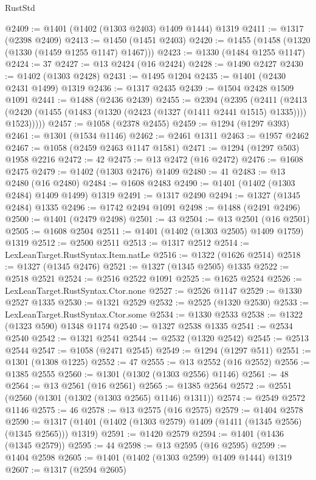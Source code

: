 \begin{lexlean}{RustStd}
\begin{coremodule}
{\begin{coremodule}
{{{{{{{{{{{{{{{{{{{{{{{{{{{{{{{{{{{{{{@2409 := @1401 (@1402 (@1303 @2403) @1409 @1444) @1319
@2411 := @1317 (@2398 @2409)
@2413 := @1450 (@1451 @2403)
@2420 := @1455 (@1458 (@1320 (@1330 (@1459 @1255 @1147) @1467)))
@2423 := @1330 (@1484 @1255 @1147)
@2424 := 37
@2427 := @13 @2424 (@16 @2424)
@2428 := @1490 @2427
@2430 := @1402 (@1303 @2428)
@2431 := @1495 @1204
@2435 := @1401 (@2430 @2431 @1499) @1319
@2436 := @1317 @2435
@2439 := @1504 @2428 @1509 @1091
@2441 := @1488 (@2436 @2439)
@2455 := @2394
    (@2395
      (@2411
        (@2413 (@2420 (@1455 (@1483 (@1320 (@2423 (@1327 (@1411 @2441 @1515) @1335)))) @1523)))))
@2457 := @1058 (@2378 @2455)
@2459 := @1294 (@1297 @393)
@2461 := @1301 (@1534 @1146)
@2462 := @2461 @1311
@2463 := @1957 @2462
@2467 := @1058 (@2459 @2463 @1147 @1581)
@2471 := @1294 (@1297 @503) @1958 @2216
@2472 := 42
@2475 := @13 @2472 (@16 @2472)
@2476 := @1608 @2475
@2479 := @1402 (@1303 @2476) @1409
@2480 := 41
@2483 := @13 @2480 (@16 @2480)
@2484 := @1608 @2483
@2490 := @1401 (@1402 (@1303 @2484) @1409 @1499) @1319
@2491 := @1317 @2490
@2494 := @1327 (@1345 @2484) @1335
@2496 := @1742 @2494 @1091
@2498 := @1488 (@2491 @2496)
@2500 := @1401 (@2479 @2498)
@2501 := 43
@2504 := @13 @2501 (@16 @2501)
@2505 := @1608 @2504
@2511 := @1401 (@1402 (@1303 @2505) @1409 @1759) @1319
@2512 := @2500 @2511
@2513 := @1317 @2512
@2514 := LexLeanTarget.RustSyntax.Item.natLe
@2516 := @1322 (@1626 @2514)
@2518 := @1327 (@1345 @2476)
@2521 := @1327 (@1345 @2505) @1335
@2522 := @2518 @2521
@2524 := @2516 @2522 @1091
@2525 := @1625 @2524
@2526 := LexLeanTarget.RustSyntax.Ctor.none
@2527 := @2526 @1147
@2529 := @1330 @2527 @1335
@2530 := @1321 @2529
@2532 := @2525 (@1320 @2530)
@2533 := LexLeanTarget.RustSyntax.Ctor.some
@2534 := @1330 @2533
@2538 := @1322 (@1323 @590) @1348 @1174
@2540 := @1327 @2538 @1335
@2541 := @2534 @2540
@2542 := @1321 @2541
@2544 := @2532 (@1320 @2542)
@2545 := @2513 @2544
@2547 := @1058 (@2471 @2545)
@2549 := @1294 (@1297 @511)
@2551 := @1301 (@1308 @1225)
@2552 := 47
@2555 := @13 @2552 (@16 @2552)
@2556 := @1385 @2555
@2560 := @1301 (@1302 (@1303 @2556) @1146)
@2561 := 48
@2564 := @13 @2561 (@16 @2561)
@2565 := @1385 @2564
@2572 := @2551 (@2560 (@1301 (@1302 (@1303 @2565) @1146) @1311))
@2574 := @2549 @2572 @1146
@2575 := 46
@2578 := @13 @2575 (@16 @2575)
@2579 := @1404 @2578
@2590 := @1317 (@1401 (@1402 (@1303 @2579) @1409 (@1411 (@1345 @2556) (@1345 @2565))) @1319)
@2591 := @1420 @2579
@2594 := @1401 (@1436 (@1345 @2579))
@2595 := 44
@2598 := @13 @2595 (@16 @2595)
@2599 := @1404 @2598
@2605 := @1401 (@1402 (@1303 @2599) @1409 @1444) @1319
@2607 := @1317 (@2594 @2605)
}}}}}}}}}}}}}}}}}}}}}}}}}}}}}}}}}}}}}}
\end{coremodule}}
\end{coremodule}
\end{lexlean}
